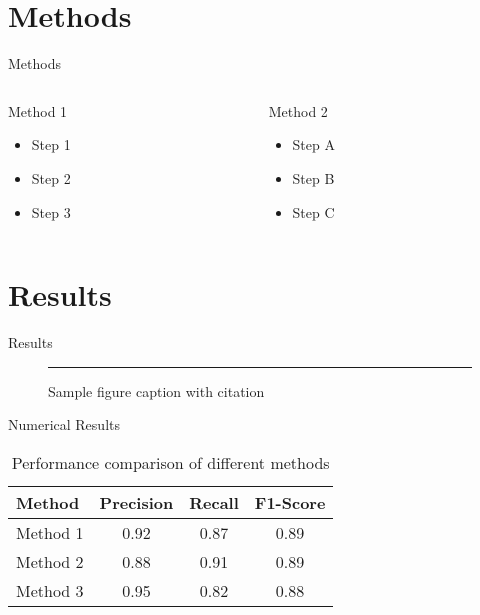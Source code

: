 \documentclass[aspectratio=169]{beamer}
\begin{document}
\section{Methods}

\begin{frame}{Methods}
  \begin{columns}[T]
    \begin{column}{0.48\textwidth}
      \begin{block}{Method 1}
        \begin{itemize}
          \item Step 1
          \item Step 2
          \item Step 3
        \end{itemize}
      \end{block}
    \end{column}
    \begin{column}{0.48\textwidth}
      \begin{block}{Method 2}
        \begin{itemize}
          \item Step A
          \item Step B
          \item Step C
        \end{itemize}
      \end{block}
    \end{column}
  \end{columns}
\end{frame}

\section{Results}

\begin{frame}{Results}
  \begin{figure}
    \centering
    \rule{0.8\textwidth}{0.6\textheight} %
    \caption{Sample figure caption with citation \cite{Wang2018}}
  \end{figure}
\end{frame}

\begin{frame}{Numerical Results}
  \begin{table}
    \centering
    \begin{tabular}{lccc}
      \hline
      \textbf{Method} & \textbf{Precision} & \textbf{Recall} & \textbf{F1-Score} \\
      \hline
      Method 1 & 0.92 & 0.87 & 0.89 \\
      Method 2 & 0.88 & 0.91 & 0.89 \\
      Method 3 & 0.95 & 0.82 & 0.88 \\
      \hline
    \end{tabular}
    \caption{Performance comparison of different methods \cite{Chen2022}}
  \end{table}
\end{frame}
\end{document}
